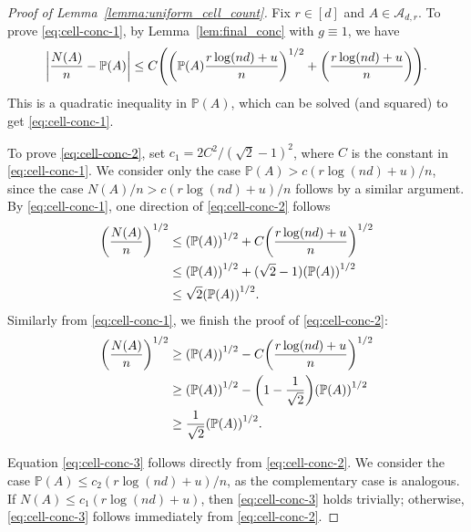 \documentclass[11pt]{article}
\theoremstyle{plain}
\theoremstyle{definition}
\theoremstyle{remark}
\theoremstyle{plain}
\DeclarePairedDelimiter{\paren}{(}{)}
\DeclarePairedDelimiter{\abs}{|}{|}
\renewcommand{\P}{\mathbb{P}}
\newcommand{\1}{\mathbbm{1}}
\begin{document}
\begin{proof}[Proof of Lemma~\ref{lemma:uniform_cell_count}]
    Fix $r\in[d]$ and $A\in\mathcal A_{d,r}$.
    To prove \eqref{eq:cell-conc-1}, by Lemma~\ref{lem:final_conc} with $g\equiv 1$, we have
    \begin{equation}\label{eq:proof-cell-conc}
        \abs*{\frac{N(A)}{n}-\P(A)}\leq C\paren*{\paren*{\P(A)\frac{r\log(nd) + u}{n}}^{1/2} + \paren*{\frac{r\log(nd) + u}{n}}}.
    \end{equation}
     This is a quadratic inequality in $\P(A)$, which can be solved (and squared) to get \eqref{eq:cell-conc-1}.

    To prove \eqref{eq:cell-conc-2}, set $c_1=2C^2/(\sqrt{2}-1)^2$, where $C$ is the constant in \eqref{eq:cell-conc-1}. We consider only the case $\P(A)>c(r\log(nd)+u)/n$, since the case $N(A)/n>c(r\log(nd)+u)/n$ follows by a similar argument. By \eqref{eq:cell-conc-1}, one direction of \eqref{eq:cell-conc-2} follows
     \begin{equation*}
        \begin{split}
            \paren*{\frac{N(A)}{n}}^{1/2}&\leq \paren*{\P(A)}^{1/2}+C\paren*{\frac{r\log(nd) + u}{n}}^{1/2}\\
            &\leq \paren*{\P(A)}^{1/2}+(\sqrt{2}-1)\paren*{\P(A)}^{1/2}\\
            &\leq \sqrt{2}\paren*{\P(A)}^{1/2}.
        \end{split}
     \end{equation*}
     Similarly from \eqref{eq:cell-conc-1}, we finish the proof of \eqref{eq:cell-conc-2}:
     \begin{equation*}
         \begin{split}
             \paren*{\frac{N(A)}{n}}^{1/2}&\geq \paren*{\P(A)}^{1/2}-C\paren*{\frac{r\log(nd) + u}{n}}^{1/2}\\
            &\geq \paren*{\P(A)}^{1/2}-\paren*{1-\frac{1}{\sqrt{2}}}\paren*{\P(A)}^{1/2}\\
            &\geq \frac{1}{\sqrt{2}}\paren*{\P(A)}^{1/2}.
         \end{split}
     \end{equation*}

    Equation \eqref{eq:cell-conc-3} follows directly from \eqref{eq:cell-conc-2}. We consider the case $\P(A)\leq c_2(r\log(nd)+u)/n$, as the complementary case is analogous. If $N(A)\leq c_1(r\log(nd)+u)$, then \eqref{eq:cell-conc-3} holds trivially; otherwise, \eqref{eq:cell-conc-3} follows immediately from \eqref{eq:cell-conc-2}. 
\end{proof}
\end{document}
